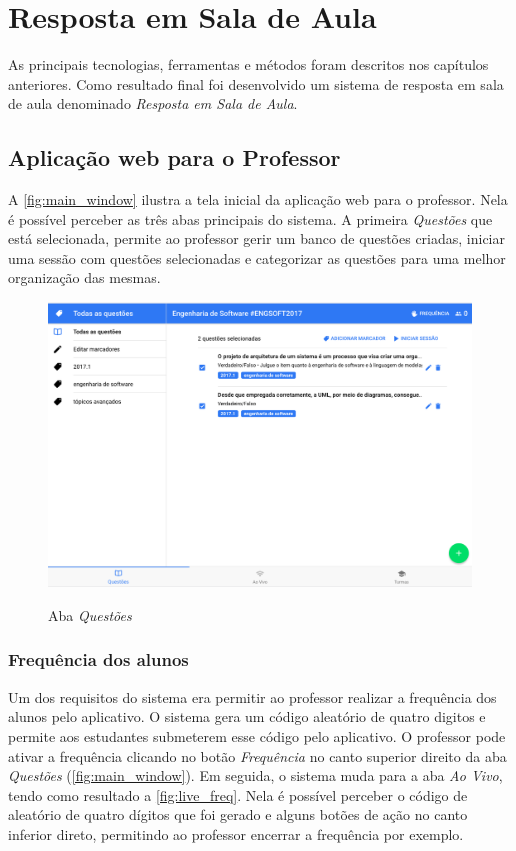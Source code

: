 \chapter{Resposta em Sala de Aula}

As principais tecnologias, ferramentas e métodos foram descritos nos capítulos
anteriores. Como resultado final foi desenvolvido um sistema de resposta
em sala de aula denominado \textit{Resposta em Sala de Aula}.

\section{Aplicação web para o Professor}

A \autoref{fig:main_window} ilustra a tela inicial da aplicação web para o professor.
Nela é possível perceber as três abas principais do sistema. A primeira \textit{Questões} que
está selecionada, permite ao professor gerir um banco de questões criadas, iniciar uma
sessão com questões selecionadas e categorizar as questões para uma melhor organização das mesmas.

\begin{figure}[ht]
  \centering
  \caption{Aba \textit{Questões}}
  \includegraphics[scale=.40]{imagens/telas/main_window}
  \doautor
  \label{fig:main_window}
\end{figure}

\subsection{Frequência dos alunos}
\label{sec:freq_students}

Um dos requisitos do sistema era permitir ao professor realizar a frequência dos alunos
pelo aplicativo. O sistema gera um código aleatório de quatro digitos e permite aos estudantes
submeterem esse código pelo aplicativo. O professor pode ativar a frequência
clicando no botão \textit{Frequência} no canto superior direito da aba \textit{Questões} (\autoref{fig:main_window}).
Em seguida, o sistema muda para a aba \textit{Ao Vivo}, tendo como resultado a \autoref{fig:live_freq}.
Nela é possível perceber o código de aleatório de quatro dígitos que foi gerado e alguns botões de ação no canto
inferior direto, permitindo ao professor encerrar a frequência por exemplo.

